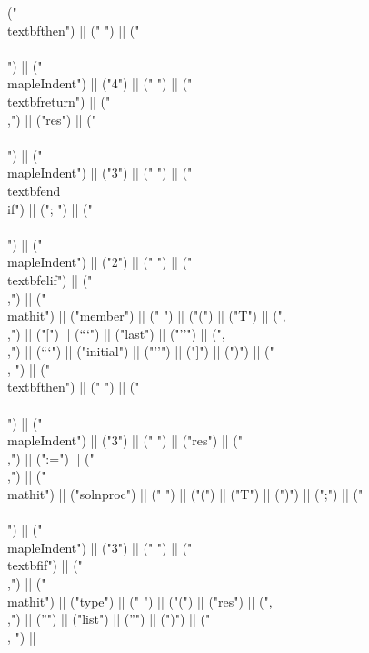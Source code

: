 \documentclass{article}
\begin{document}
\begin{center}
\begin{maplelatex}
{ ("\\textbf{then}") || (" ") || ("\\\\\n") || ("\\mapleIndent{") || ("4") || ("} ") || ("\\textbf{return}") || ("\\,") || ("res") || ("\\\\\n") || ("\\mapleIndent{") || ("3") || ("} ") || ("\\textbf{end\\ if}") || ("; ") || ("\\\\\n") || ("\\mapleIndent{") || ("2") || ("} ") || ("\\textbf{elif}") || (" \\,") || ("\\mathit{") || ("member") || ("} ") || ("(") || ("T") || (",\\,") || ("[") || ("``") || ("last") || ("''") || (",\\,") || ("``") || ("initial") || ("''") || ("]") || (")") || (" \\, ") || ("\\textbf{then}") || (" ") || ("\\\\\n") || ("\\mapleIndent{") || ("3") || ("} ") || ("res") || ("\\,") || (":=") || ("\\,") || ("\\mathit{") || ("solnproc") || ("} ") || ("(") || ("T") || (")") || (";") || ("\\\\\n") || ("\\mapleIndent{") || ("3") || ("} ") || ("\\textbf{if}") || (" \\,") || ("\\mathit{") || ("type") || ("} ") || ("(") || ("res") || (",\\,") || ("'") || ("list") || ("'") || (")") || (" \\, ") || }
\end{maplelatex}
\end{center}
\end{document}
